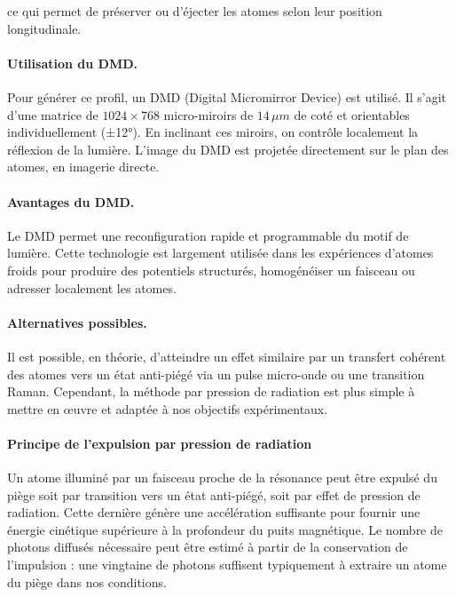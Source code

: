 ce qui permet de préserver ou d’éjecter les atomes selon leur position longitudinale.

\paragraph{Utilisation du DMD.}

Pour générer ce profil, un \gls{DMD} (Digital Micromirror Device) est utilisé. Il s’agit d’une matrice de \(1024 \times 768\) micro-miroirs de $14 \, \mu m$ de coté et  orientables individuellement (±12°). En inclinant ces miroirs, on contrôle localement la réflexion de la lumière. L’image du \gls*{DMD} est projetée directement sur le plan des atomes, en imagerie directe.

\paragraph{Avantages du DMD.}

Le  \gls*{DMD} permet une reconfiguration rapide et programmable du motif de lumière. Cette technologie est largement utilisée dans les expériences d’atomes froids pour produire des potentiels structurés, homogénéiser un faisceau ou adresser localement les atomes.

\paragraph{Alternatives possibles.}

Il est possible, en théorie, d’atteindre un effet similaire par un transfert cohérent des atomes vers un état anti-piégé via un pulse micro-onde ou une transition Raman. Cependant, la méthode par pression de radiation est plus simple à mettre en œuvre et adaptée à nos objectifs expérimentaux.

\paragraph{Principe de l’expulsion par pression de radiation}

Un atome illuminé par un faisceau proche de la résonance peut être expulsé du piège soit par transition vers un état anti-piégé, soit par effet de pression de radiation. Cette dernière génère une accélération suffisante pour fournir une énergie cinétique supérieure à la profondeur du puits magnétique. Le nombre de photons diffusés nécessaire peut être estimé à partir de la conservation de l’impulsion : une vingtaine de photons suffisent typiquement à extraire un atome du piège dans nos conditions.

